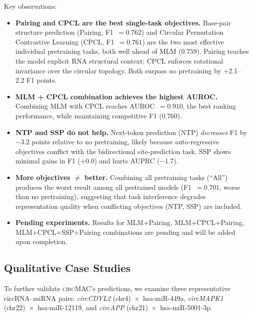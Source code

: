 \documentclass[11pt]{article}
\newcommand{\model}{\textsc{circMAC}}
\begin{document}
Key observations:
\begin{itemize}[leftmargin=*]
  \item \textbf{Pairing and CPCL are the best single-task objectives.}
        Base-pair structure prediction (Pairing, F1~$=0.762$) and
        Circular Permutation Contrastive Learning (CPCL, F1~$=0.761$)
        are the two most effective individual pretraining tasks, both
        well ahead of MLM ($0.759$).
        Pairing teaches the model explicit RNA structural context;
        CPCL enforces rotational invariance over the circular topology.
        Both surpass no pretraining by $+$2.1--2.2 F1 points.
  \item \textbf{MLM + CPCL combination achieves the highest AUROC.}
        Combining MLM with CPCL reaches AUROC~$=0.910$, the best ranking
        performance, while maintaining competitive F1 ($0.760$).
  \item \textbf{NTP and SSP do not help.}
        Next-token prediction (NTP) \textit{decreases} F1 by $-3.2$ points
        relative to no pretraining, likely because auto-regressive objectives
        conflict with the bidirectional site-prediction task.
        SSP shows minimal gains in F1 ($+0.0$) and hurts AUPRC ($-1.7$).
  \item \textbf{More objectives $\neq$ better.}
        Combining all pretraining tasks (``All'') produces the worst result
        among all pretrained models (F1~$=0.701$, worse than no pretraining),
        suggesting that task interference degrades representation quality when
        conflicting objectives (NTP, SSP) are included.
  \item \textbf{Pending experiments.}
        Results for MLM+Pairing, MLM+CPCL+Pairing, MLM+CPCL+SSP+Pairing
        combinations are pending and will be added upon completion.
\end{itemize}


\subsection{Qualitative Case Studies}

To further validate \model{}'s predictions, we examine three representative
circRNA--miRNA pairs:
\textit{circCDYL2} (chr4)~$\times$~hsa-miR-449a,
\textit{circMAPK1} (chr22)~$\times$~hsa-miR-12119, and
\textit{circAPP} (chr21)~$\times$~hsa-miR-5001-3p.
\end{document}
